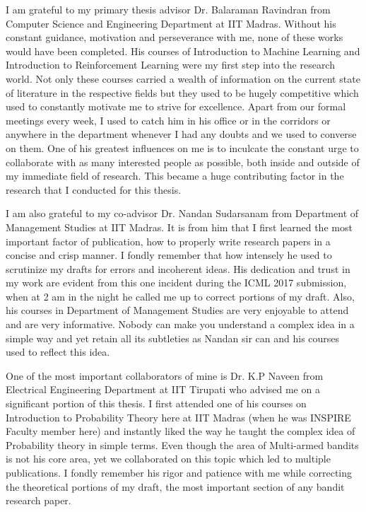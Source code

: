 I am grateful to my primary thesis advisor Dr. Balaraman Ravindran from Computer Science and Engineering Department at IIT Madras. Without his constant guidance, motivation and perseverance with me, none of these works would have been completed. His courses of Introduction to Machine Learning and Introduction to Reinforcement Learning were my first step into the research world. Not only these courses carried a wealth of information on the current state of literature in the respective fields but they used to be hugely competitive which used to constantly motivate me to strive for excellence. Apart from our formal meetings every week, I used to catch him in his office or in the corridors or anywhere in the department whenever I had any doubts and we used to converse on them. One of his greatest influences on me is to inculcate the constant urge to collaborate with as many interested people as possible, both inside and outside of my immediate field of research. This became a huge contributing factor in the research that I conducted for this thesis.

I am also grateful to my co-advisor Dr. Nandan Sudarsanam from Department of Management Studies at IIT Madras. It is from him that I first learned the most important factor of publication, how to properly write research papers in a concise and crisp manner. I fondly remember that how intensely he used to scrutinize my drafts for errors and incoherent ideas. His dedication and trust in my work are evident from this one incident during the ICML 2017 submission, when at 2 am in the night he called me up to correct portions of my draft. Also, his courses in Department of Management Studies are very enjoyable to attend and are very informative. Nobody can make you understand a complex idea in a simple way and yet retain all its subtleties as Nandan sir can and his courses used to reflect this idea.

One of the most important collaborators of mine is Dr. K.P Naveen from Electrical Engineering Department at IIT Tirupati who advised me on a significant portion of this thesis. I first attended one of his courses on Introduction to Probability Theory here at IIT Madras (when he was INSPIRE Faculty member here) and instantly liked the way he taught the complex idea of Probability theory in simple terms. Even though the area of Multi-armed bandits is not his core area, yet we collaborated on this topic which led to multiple publications. I fondly remember his rigor and patience with me while correcting the theoretical portions of my draft, the most important section of any bandit research paper.

